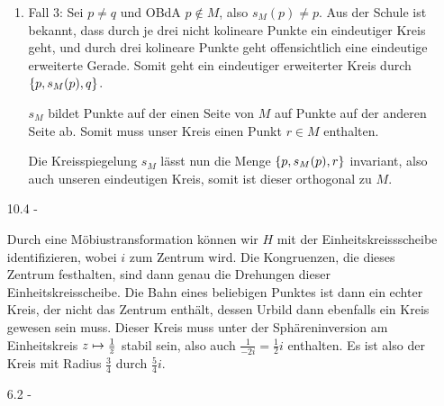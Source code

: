 \documentclass{article}
\begin{document}
\begin{enumerate}
\begin{enumerate}
			\item Fall $3$: Sei $p \neq q$ und OBdA $p \notin M$, also $s_M(p) \neq p$. Aus der Schule ist bekannt, dass durch je drei nicht kolineare Punkte ein eindeutiger Kreis geht, und durch drei kolineare Punkte geht offensichtlich eine eindeutige erweiterte Gerade. Somit geht ein eindeutiger erweiterter Kreis durch $\lr{p,s_M(p),q}$.
			
			$s_M$ bildet Punkte auf der einen Seite von $M$ auf Punkte auf der anderen Seite ab. Somit muss unser Kreis einen Punkt $r \in M$ enthalten.  
			
			Die Kreisspiegelung $s_M$ lässt nun die Menge $\lr{p,s_M(p),r}$ invariant, also auch unseren eindeutigen Kreis, somit ist dieser orthogonal zu $M$.
		\end{enumerate}
		

		
		\item[10.4 - \tbf{3}]
		
		Durch eine Möbiustransformation können wir $H$ mit der Einheitskreissscheibe identifizieren, wobei $i$ zum Zentrum wird. Die Kongruenzen, die dieses Zentrum festhalten, sind dann genau die Drehungen dieser Einheitskreisscheibe. Die Bahn eines beliebigen Punktes ist dann ein echter Kreis, der nicht das Zentrum enthält, dessen Urbild dann ebenfalls ein Kreis gewesen sein muss. Dieser Kreis muss unter der Sphäreninversion am Einheitskreis $z \mapsto \frac{1}{\overline{{z}}}$ stabil sein, also auch $\frac{1}{-2i} = \frac{1}{2}i$ enthalten. Es ist also der Kreis mit Radius $\frac{3}{4}$ durch $\frac{5}{4}i$.
		\item[6.2 - \tbf{3}]
		

\end{enumerate}
\end{document}
